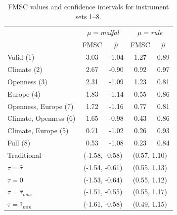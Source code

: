 \documentclass[12pt]{article}
\theoremstyle{definition}
\begin{document}
\begin{table}[htbp]
\caption{FMSC values and confidence intervals for instrument sets 1--8.}
\label{tab:replicate}
\small
 \begin{center}
 \begin{tabular}{lcccc}\hline\hline
 & \multicolumn{2}{c}{$\mu=$\emph{malfal}}& \multicolumn{2}{c}{$\mu=$\emph{rule}}\\
&\multicolumn{1}{c}{FMSC}&\multicolumn{1}{c}{$\widehat{\mu}$}&\multicolumn{1}{c}{FMSC}&\multicolumn{1}{c}{$\widehat{\mu}$}\tabularnewline
\hline
Valid (1)&3.03&-1.04&1.27&0.89\tabularnewline
Climate (2)&2.67&-0.90&0.92&0.97\tabularnewline   
Openness (3)&2.31&-1.09&1.23&0.81\tabularnewline  
Europe (4)&1.83&-1.14&0.55&0.86\tabularnewline
Openness, Europe (7)&1.72&-1.16&0.77&0.81\tabularnewline  
Climate, Openness (6)&1.65&-0.98&0.43&0.86\tabularnewline
Climate, Europe (5)&0.71&-1.02&0.26&0.93\tabularnewline
Full (8)&0.53&-1.08&0.23&0.84\tabularnewline
\hline 
Traditional&\multicolumn{2}{c}{(-1.58, -0.58)}&\multicolumn{2}{c}{(0.57, 1.10)}\\
$\tau = \widehat{\tau}$&\multicolumn{2}{c}{(-1.54, -0.61)}&\multicolumn{2}{c}{(0.55, 1.13)}\\
$\tau = 0$&\multicolumn{2}{c}{(-1.53, -0.64)}&\multicolumn{2}{c}{(0.55, 1.12)}\\
$\tau = \widehat{\tau}_{max}$&\multicolumn{2}{c}{(-1.51, -0.55)}&\multicolumn{2}{c}{(0.55, 1.17)}\\
$\tau = \widehat{\tau}_{min}$&\multicolumn{2}{c}{(-1.61, -0.58)}&\multicolumn{2}{c}{(0.49, 1.15)}\\
\hline

\end{tabular}
\end{center}
\end{table}
\end{document}
